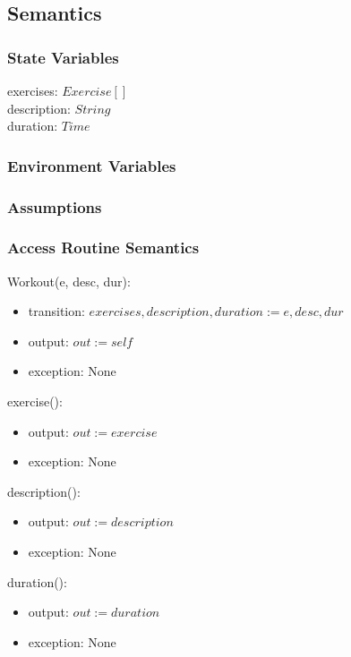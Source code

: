 \documentclass[12pt, titlepage]{article}
\begin{document}
\subsection{Semantics}

\subsubsection{State Variables}
exercises: $Exercise[]$ \\
description: $String$ \\
duration: $Time$ \\

\subsubsection{Environment Variables}

\subsubsection{Assumptions}

\subsubsection{Access Routine Semantics}

Workout(e, desc, dur):
\begin{itemize}
	\item transition: $exercises, description, duration := e, desc, dur$
	\item output: $out := self$
	\item exception: None
\end{itemize}

exercise():
\begin{itemize}
	\item output: $out := exercise$
	\item exception: None
\end{itemize}

description():
\begin{itemize}
	\item output: $out := description$
	\item exception: None
\end{itemize}

duration():
\begin{itemize}
	\item output: $out := duration$
	\item exception: None
\end{itemize}
\end{document}
